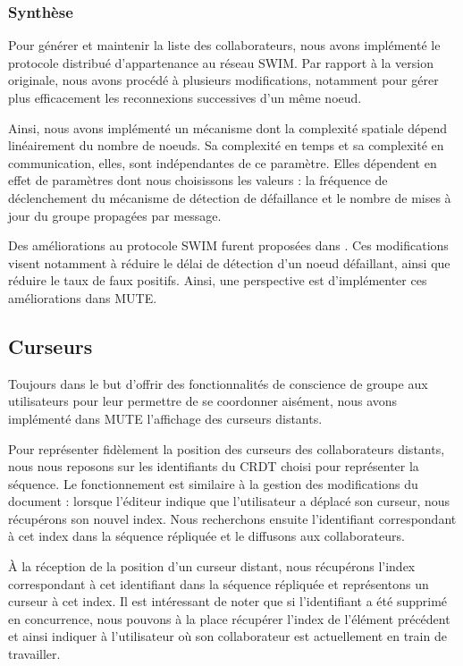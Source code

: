 \documentclass[12pt]{thesul}
\begin{document}
\subsubsection{Synthèse}

Pour générer et maintenir la liste des collaborateurs, nous avons implémenté le protocole distribué d'appartenance au réseau SWIM\cite{swim2002}.
Par rapport à la version originale, nous avons procédé à plusieurs modifications, notamment pour gérer plus efficacement les reconnexions successives d'un même noeud.

Ainsi, nous avons implémenté un mécanisme dont la complexité spatiale dépend linéairement du nombre de noeuds.
Sa complexité en temps et sa complexité en communication, elles, sont indépendantes de ce paramètre.
Elles dépendent en effet de paramètres dont nous choisissons les valeurs : la fréquence de déclenchement du mécanisme de détection de défaillance et le nombre de mises à jour du groupe propagées par message.

Des améliorations au protocole SWIM furent proposées dans \cite{lifeguard2018}.
Ces modifications visent notamment à réduire le délai de détection d'un noeud défaillant, ainsi que réduire le taux de faux positifs.
Ainsi, une perspective est d'implémenter ces améliorations dans MUTE.

\subsection{Curseurs}

Toujours dans le but d'offrir des fonctionnalités de conscience de groupe aux utilisateurs pour leur permettre de se coordonner aisément, nous avons implémenté dans MUTE l'affichage des curseurs distants.

Pour représenter fidèlement la position des curseurs des collaborateurs distants, nous nous reposons sur les identifiants du \ac{CRDT} choisi pour représenter la séquence.
Le fonctionnement est similaire à la gestion des modifications du document : lorsque l'éditeur indique que l'utilisateur a déplacé son curseur, nous récupérons son nouvel index.
Nous recherchons ensuite l'identifiant correspondant à cet index dans la séquence répliquée et le diffusons aux collaborateurs.

À la réception de la position d'un curseur distant, nous récupérons l'index correspondant à cet identifiant dans la séquence répliquée et représentons un curseur à cet index.
Il est intéressant de noter que si l'identifiant a été supprimé en concurrence, nous pouvons à la place récupérer l'index de l'élément précédent et ainsi indiquer à l'utilisateur où son collaborateur est actuellement en train de travailler.
\end{document}
